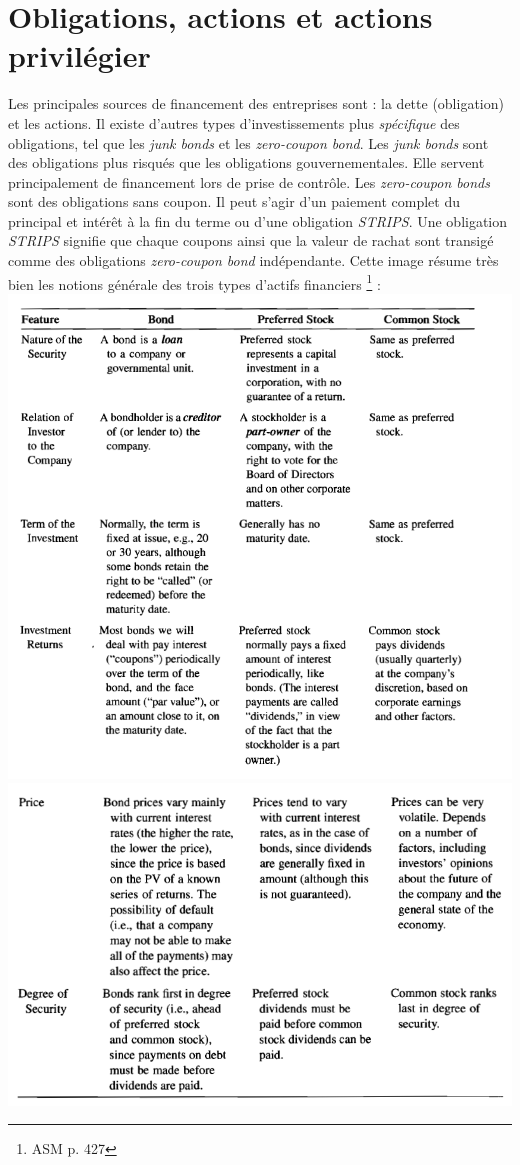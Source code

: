 \documentclass[11pt,french]{report}
\begin{document}
\section{Obligations, actions et actions privilégier}
\label{sec:actifs financiers}
Les principales sources de financement des entreprises sont : la dette (obligation) et les actions. Il existe d'autres types d'investissements plus \emph{spécifique} des obligations, tel que les \emph{junk bonds} et les \emph{zero-coupon bond}. Les \emph{junk bonds} sont des obligations plus risqués que les obligations gouvernementales. Elle servent principalement de financement lors de prise de contrôle. Les  \emph{zero-coupon bonds} sont des obligations sans coupon. Il peut s'agir d'un paiement complet du principal et intérêt à la fin du terme ou d'une obligation \emph{STRIPS}. Une obligation \emph{STRIPS} signifie que chaque coupons ainsi que la valeur de rachat sont transigé comme des obligations  \emph{zero-coupon bond} indépendante.
Cette image résume très bien les notions générale des trois types d'actifs financiers \footnote{ASM p. 427} :
\\
\includegraphics[scale=0.5]{picture18.PNG} 
\\
\includegraphics[scale=0.5]{picture19.PNG}
\\
\end{document}

